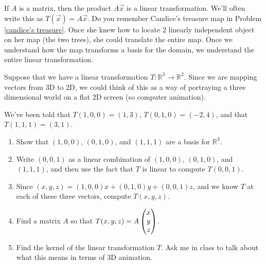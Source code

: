 









If $A$ is a matrix, then the product $A\vec x$ is a linear transformation.  We'll often write this as $T(\vec x) = A\vec x$. Do you remember Candice's treasure map in Problem \ref{candice's treasure}.  Once she knew how to locate 2 linearly independent object on her map (the two trees), she could translate the entire map. Once we understand how the map transforms a basis for the domain, we understand the entire linear transformation.  

\begin{problem}
 Suppose that we have a linear transformation $T:\mathbb{R}^3\to \mathbb{R}^2$. Since we are mapping vectors from 3D to 2D, we could think of this as a way of portraying a three dimensional world on a flat 2D screen (so computer animation). 
 
 We've been told that $T(1,0,0) = (1,3)$, $T(0,1,0) = (-2,4)$, and that $T(1,1,1)=(3,1)$. 
\begin{enumerate}
 \item Show that $(1,0,0)$, $(0,1,0)$, and $(1,1,1)$ are a basis for $\mathbb{R}^3$. 
 \item Write $(0,0,1)$ as a linear combination of $(1,0,0)$, $(0,1,0)$, and $(1,1,1)$, and then use the fact that $T$ is linear to compute $T(0,0,1)$. 
 \item Since $(x,y,z) = (1,0,0)x+(0,1,0)y+(0,0,1)z$, and we know $T$ at each of these three vectors, compute $T(x,y,z)$. 
 \item Find a matrix $A$ so that $T(x,y,z)= A\begin{pmatrix} x\\y\\z \end{pmatrix}$. 
 \item Find the kernel of the linear transformation $T$. Ask me in class to talk about what this means in terms of 3D animation.
\end{enumerate}
    
\end{problem}

